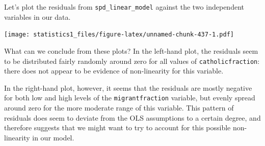 \documentclass[]{article}
\newenvironment{Shaded}{\begin{snugshade}}{\end{snugshade}}
\newcommand{\KeywordTok}[1]{\textcolor[rgb]{0.13,0.29,0.53}{\textbf{#1}}}
\newcommand{\DataTypeTok}[1]{\textcolor[rgb]{0.13,0.29,0.53}{#1}}
\newcommand{\DecValTok}[1]{\textcolor[rgb]{0.00,0.00,0.81}{#1}}
\newcommand{\StringTok}[1]{\textcolor[rgb]{0.31,0.60,0.02}{#1}}
\newcommand{\OperatorTok}[1]{\textcolor[rgb]{0.81,0.36,0.00}{\textbf{#1}}}
\newcommand{\NormalTok}[1]{#1}
\theoremstyle{definition}
\theoremstyle{definition}
\theoremstyle{definition}
\theoremstyle{remark}
\begin{document}
Let's plot the residuals from \texttt{spd\_linear\_model} against the
two independent variables in our data.

\begin{Shaded}
\end{Shaded}

\texttt{[image: statistics1\_files/figure-latex/unnamed-chunk-437-1.pdf]}

What can we conclude from these plots? In the left-hand plot, the
residuals seem to be distributed fairly randomly around zero for all
values of \texttt{catholicfraction}: there does not appear to be
evidence of non-linearity for this variable.

In the right-hand plot, however, it seems that the residuals are mostly
negative for both low and high levels of the \texttt{migrantfraction}
variable, but evenly spread around zero for the more moderate range of
this variable. This pattern of residuals does seem to deviate from the
OLS assumptions to a certain degree, and therefore suggests that we
might want to try to account for this possible non-linearity in our
model.
\end{document}
